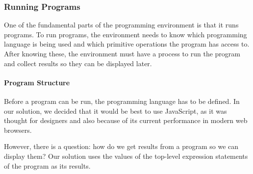 

\subsubsection{Running Programs}
One of the fundamental parts of the programming environment is that it runs programs.
To run programs, the environment needs to know which programming language is being used and which primitive operations the program has access to.
After knowing these, the environment must have a process to run the program and collect results so they can be displayed later.


\paragraph{Program Structure}
Before a program can be run, the programming language has to be defined.
In our solution, we decided that it would be best to use JavaScript, as it was thought for designers and also because of its current performance in modern web browsers.

However, there is a question: how do we get results from a program so we can display them?
Our solution uses the values of the top-level expression statements of the program as its results.

